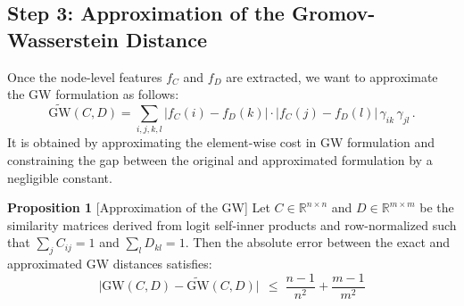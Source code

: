 \documentclass{article}
\begin{document}
\subsection*{Step 3: Approximation of the Gromov-Wasserstein Distance}
\label{Step 3: Approximation of the Gromov-Wasserstein Distance}
Once the node-level features \( f_C \) and \( f_D \) are extracted, we want to approximate the GW formulation as follows:
\[
\widetilde{\text{GW}}(C,D) = \sum_{i,j,k,l} \big| f_C(i) - f_D(k) \big| \cdot \big| f_C(j) - f_D(l) \big| \, \gamma_{ik} \, \gamma_{jl}\,.
\]
It is obtained by approximating the element-wise cost in GW formulation and constraining the gap between the original and approximated formulation by a negligible constant. 

\textbf{Proposition 1} [Approximation of the GW]
\label{lem:gwcost}
Let $C \in \mathbb{R}^{n \times n}$ and $D \in \mathbb{R}^{m \times m}$ be the similarity matrices derived from logit self-inner products and row-normalized such that $\sum_{j} C_{ij} = 1$ and $\sum_{l} D_{kl} = 1$. Then the absolute error between the exact and approximated GW distances satisfies:
\begin{equation}
\bigl|\mathrm{GW}(C,D) - \widetilde{\mathrm{GW}}(C,D)\bigr|\,
\;\le\;
\frac{n-1}{n^2} + \frac{m-1}{m^2}
\end{equation}
\end{document}
